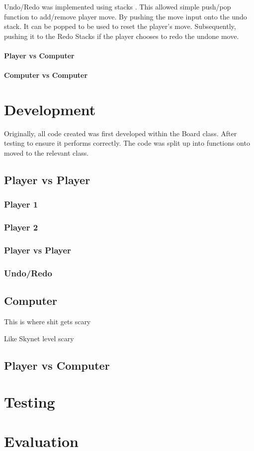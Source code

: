 \documentclass[10pt, a4paper]{article}
\begin{document}
    Undo/Redo was implemented using stacks . This allowed simple push/pop function to add/remove player move. By pushing the move input onto the undo stack. It can be popped to be used to reset the player's move. Subsequently, pushing it to the Redo Stacks if the player chooses to redo the undone move.
    \paragraph{Player vs Computer}
    \paragraph{Computer vs Computer}
    \section{Development}
    Originally, all code created was first developed within the Board class. After testing to ensure it performs correctly. The code was split up into functions onto moved to the relevant class.
    \subsection{Player vs Player}
    \subsubsection{Player 1}
    \subsubsection{Player 2}
    \subsubsection{Player vs Player}
    \subsubsection{Undo/Redo}
    \subsection{Computer}
    This is where shit gets scary
    
    Like Skynet level scary
    \subsection{Player vs Computer}
    
    
    \section{Testing}
\section{Evaluation}	


		
\end{document}
